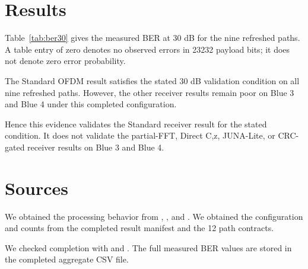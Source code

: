 \documentclass[11pt]{article}
\begin{document}
\section{Results}

Table~\ref{tab:ber30} gives the measured BER at 30 dB for the nine refreshed
paths.  A table entry of zero denotes no observed errors in 23232 payload bits;
it does not denote zero error probability.

\begin{table}[htbp]
\centering
\caption{Measured BER at 30 dB for the completed $N=512$ configuration.}
\label{tab:ber30}
\end{table}

The Standard OFDM result satisfies the stated 30 dB validation condition on
all nine refreshed paths.  However, the other receiver results remain poor on
Blue 3 and Blue 4 under this completed configuration.

Hence this evidence validates the Standard receiver result for the stated
condition.  It does not validate the partial-FFT, Direct C,z, JUNA-Lite, or
CRC-gated receiver results on Blue 3 and Blue 4.

\section{Sources}

We obtained the processing behavior from
,
, and
.  We obtained the configuration and
counts from the completed result manifest and the 12 path contracts.

We checked completion with
 and
.  The full measured
BER values are stored in the completed aggregate CSV file.
\end{document}
